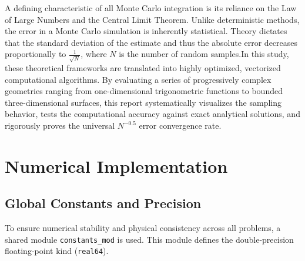 \documentclass[12pt, a4paper, twoside]{article}
\begin{document}
      A defining characteristic of all Monte Carlo integration is its reliance on the Law of Large Numbers and the Central Limit Theorem. Unlike deterministic methods, the error in a Monte Carlo simulation is inherently statistical. Theory dictates that the standard deviation of the estimate and thus the absolute error decreases proportionally to $\frac{1}{\sqrt{N}}$, where $N$ is the number of random samples.In this study, these theoretical frameworks are translated into highly optimized, vectorized computational algorithms. By evaluating a series of progressively complex geometries ranging from one-dimensional trigonometric functions to bounded three-dimensional surfaces, this report systematically visualizes the sampling behavior, tests the computational accuracy against exact analytical solutions, and rigorously proves the universal $N^{-0.5}$ error convergence rate.

    \section{Numerical Implementation}

        \subsection{Global Constants and Precision}
        To ensure numerical stability and physical consistency across all problems, a shared module \texttt{constants\_mod} is used. This module defines the double-precision floating-point kind (\texttt{real64}).

        
\end{document}
